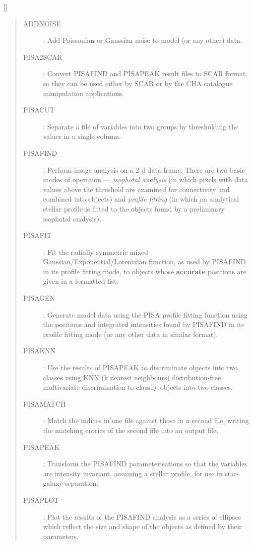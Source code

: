 \vspace{-10mm}

\hfill []

\vspace{2mm}

\begin{quote}
\begin{description}

\item [ADDNOISE] :
 Add Poissonian or Gaussian noise to model (or any other) data.

\item [PISA2SCAR] :
 Convert PISAFIND and PISAPEAK result files to SCAR format, so they can be
 used either by SCAR or by the CHA catalogue manipulation applications.

\item [PISACUT] :
 Separate a file of variables into two groups by thresholding the values in a
 single column.

\item [PISAFIND] :
 Perform image analysis on a 2-d data frame.
 There are two basic modes of operation --- {\em isophotal analysis} (in which
 pixels  with data values above the threshold are examined for connectivity and
 combined into objects) and {\em profile fitting} (in which an analytical
 stellar profile is fitted to the objects found by a preliminary isophotal
 analysis).

\item [PISAFIT] :
 Fit the radially symmetric mixed Gaussian/Exponential/Lorentzian function,
 as used by PISAFIND in its profile fitting mode, to objects whose
 {\bf accurate} positions are given in a formatted list.

\item [PISAGEN] :
 Generate model data using the PISA profile fitting function using the positions
 and integrated intensities found by PISAFIND in its profile fitting mode (or
 any other data in similar format).

\item [PISAKNN] :
 Use the results of PISAPEAK to discriminate objects into two classes using
 KNN (k nearest neighbours) distribution-free multivariate discrimination to
 classify objects into two classes.

\item [PISAMATCH] :
 Match the indices in one file against those in a second file, writing the
 matching entries of the second file into an output file.

\item [PISAPEAK] :
 Transform the PISAFIND parameterisations so that the variables are intensity
 invariant, assuming a stellar profile, for use in star-galaxy separation.

\item [PISAPLOT] :
 Plot the results of the PISAFIND analysis as a series of ellipses which
 reflect the size and shape of the objects as defined by their parameters.

\end{description}
\end{quote}

